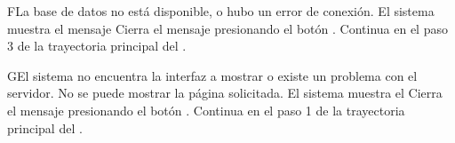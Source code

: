 
\begin{UCtrayectoriaA}{F}{La base de datos no está disponible, o hubo un error de conexión.}
	\UCpaso El sistema muestra el mensaje 
	\UCpaso[\UCactor] Cierra el mensaje presionando el botón .
	\UCpaso Continua en el paso 3 de la trayectoria principal del .
\end{UCtrayectoriaA}


\begin{UCtrayectoriaA}{G}{El sistema no encuentra la interfaz a mostrar o existe un problema con el servidor.}
	\UCpaso No se puede mostrar la página solicitada.
	\UCpaso El sistema muestra el 
	\UCpaso[\UCactor] Cierra el mensaje presionando el botón .
	\UCpaso Continua en el paso 1 de la trayectoria principal del .
\end{UCtrayectoriaA}



